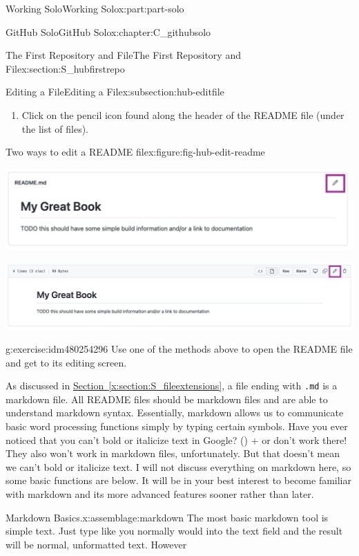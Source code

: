 \documentclass[oneside,10pt,]{book}
\newcommand{\xreffont}{\relax}
\newcommand{\mono}[1]{\texttt{#1}}
\newcommand{\kbd}[1]{\keys{{#1}}}
\begin{document}
\begin{partptx}{Working Solo}{}{Working Solo}{}{}{x:part:part-solo}
\begin{chapterptx}{GitHub Solo}{}{GitHub Solo}{}{}{x:chapter:C_githubsolo}
\begin{sectionptx}{The First Repository and File}{}{The First Repository and File}{}{}{x:section:S_hubfirstrepo}
\begin{subsectionptx}{Editing a File}{}{Editing a File}{}{}{x:subsection:hub-editfile}
\begin{enumerate}
\item{}Click on the pencil icon found along the header of the README file (under the list of files).%
\end{enumerate}
%
\begin{figureptx}{Two ways to edit a README file}{x:figure:fig-hub-edit-readme}{}%
\begin{image}{0.05}{0.9}{0.05}%
\includegraphics[width=\linewidth]{external/hub_edit_readme_code.pdf}
\end{image}%
\begin{image}{0.05}{0.9}{0.05}%
\includegraphics[width=\linewidth]{external/hub_edit_readme_file.pdf}
\end{image}%
\tcblower
\end{figureptx}%
\begin{inlineexercise}{}{g:exercise:idm480254296}%
Use one of the methods above to open the README file and get to its editing screen.%
\end{inlineexercise}%
As discussed in \hyperref[x:section:S_fileextensions]{Section~{\xreffont\ref{x:section:S_fileextensions}}}, a file ending with \mono{.md} is a markdown file. All README files should be markdown files and are able to understand markdown syntax. Essentially, markdown allows us to communicate basic word processing functions simply by typing certain symbols. Have you ever noticed that you can't bold or italicize text in Google? \kbd{Control} (\kbd{Command}) + \kbd{B} or \kbd{I} don't work there! They also won't work in markdown files, unfortunately. But that doesn't mean we can't bold or italicize text. I will not discuss everything on markdown here, so some basic functions are below. It will be in your best interest to become familiar with markdown and its more advanced features sooner rather than later.%
\begin{assemblage}{Markdown Basics.}{x:assemblage:markdown}%
The most basic markdown tool is simple text. Just type like you normally would into the text field and the result will be normal, unformatted text. However\textellipsis{}%

\end{assemblage}
\end{subsectionptx}
\end{sectionptx}
\end{chapterptx}
\end{partptx}
\end{document}
